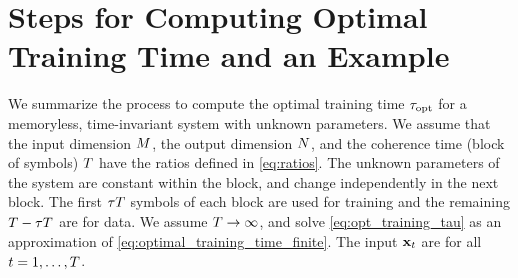 \documentclass[12pt, draftclsnofoot,journal,onecolumn]{IEEEtran}
\begin{document}
\section{Steps for Computing Optimal Training Time and an Example}
\label{sec:step_by_step_tauopt}
We summarize the process to compute the optimal training time $\tau_{{\rm opt}}$ for a memoryless, time-invariant system with unknown parameters.  We assume that the input dimension $M$, the output dimension $N$, and the coherence time (block of symbols) $T$ have the ratios defined in \eqref{eq:ratios}. The unknown parameters of the system are constant within the block, and change independently in the next block.  The first ${\tau T}$ symbols of each block are used for training and the remaining $T-{\tau T}$ are for data.  We assume $T\to \infty$, and solve \eqref{eq:opt_training_tau} as an approximation of \eqref{eq:optimal_training_time_finite}.  The input ${\mathbf{x}}_t$ are \iid for all $t=1,\dots,T$. 
\end{document}
